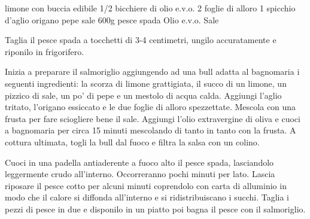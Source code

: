 \begin{ingreds}
	 limone con buccia edibile
	1/2 bicchiere di olio e.v.o. 
	2 foglie di alloro 
	1 spicchio d'aglio 
	origano 
	pepe
	sale
\columnbreak
     	600g pesce spada
     	Olio e.v.o.
	Sale
\end{ingreds}

\begin{method}
Taglia il pesce spada a tocchetti di 3-4 centimetri, ungilo accuratamente e riponilo in frigorifero.

Inizia a preparare il salmoriglio aggiungendo ad una bull adatta al bagnomaria i seguenti ingredienti: la scorza di limone grattigiata, il succo di un limone, un pizzico di sale, un po' di pepe e un mestolo di acqua calda. Aggiungi l'aglio tritato, l'origano essiccato e le due foglie di alloro spezzettate. Mescola con una frusta per fare sciogliere bene il sale. Aggiungi l'olio extravergine di oliva e cuoci a bagnomaria per circa 15 minuti mescolando di tanto in tanto con la frusta. A cottura ultimata, togli la bull dal fuoco e filtra la salsa con un colino.

Cuoci in una padella antiaderente a fuoco alto il pesce spada, lasciandolo leggermente crudo all'interno. Occorreranno pochi minuti per lato. Lascia riposare il pesce cotto per alcuni minuti coprendolo con carta di alluminio in modo che il calore si diffonda all'interno e si ridistribuiscano i succhi. Taglia i pezzi di pesce in due e disponilo in un piatto poi bagna il pesce con il salmoriglio.

\end {method}



